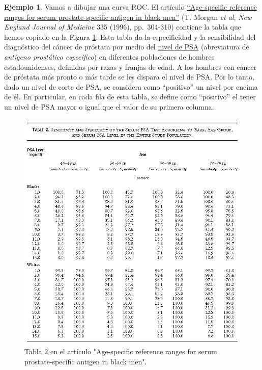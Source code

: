 \documentclass[
]{book}
\theoremstyle{definition}
\theoremstyle{definition}
\newtheorem{example}{Ejemplo}[chapter]
\theoremstyle{definition}
\theoremstyle{definition}
\theoremstyle{remark}
\begin{document}
\begin{example}
\protect\hypertarget{exm:unnamed-chunk-168}{}\label{exm:unnamed-chunk-168}Vamos a dibujar una curva ROC. El artículo \href{https://www.nejm.org/doi/full/10.1056/NEJM199608013350502}{``Age-specific reference ranges for serum prostate-specific antigen in black men''} (T. Morgan \emph{et al}, \emph{New England Journal of Medicine} 335 (1996), pp.~304-310) contiene la tabla que hemos copiado en la Figura \ref{fig:tablapsaglobal}. Esta tabla da la especificidad y la sensibilidad del diagnóstico del cáncer de próstata por medio del \href{https://medlineplus.gov/spanish/pruebas-de-laboratorio/prueba-de-psa-antigeno-prostatico-especifico/}{nivel de PSA} (abreviatura de \emph{antígeno prostático específico}) en diferentes poblaciones de hombres estadounidenses, definidas por razas y franjas de edad. A los hombres con cáncer de próstata más pronto o más tarde se les dispara el nivel de PSA. Por lo tanto, dado un nivel de corte de PSA, se considera como ``positivo'' un nivel por encima de él. En particular, en cada fila de esta tabla, se define como ``positivo'' el tener un nivel de PSA mayor o igual que el valor de su primera columna.
\end{example}

\begin{figure}

{\centering \includegraphics[width=0.8\linewidth]{INREMDN_files/figure-html/tablapsaglobal} 

}

\caption{Tabla 2 en el artículo "Age-specific reference ranges for serum prostate-specific antigen in black men".}\label{fig:tablapsaglobal}
\end{figure}
\end{document}
